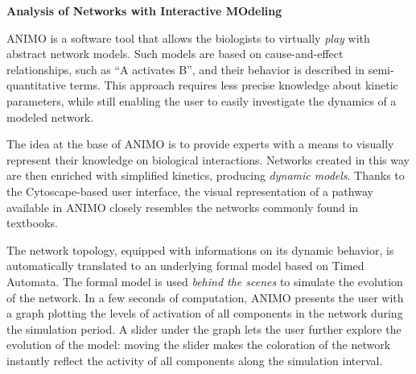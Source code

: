 


\begin{mdframed}[style=ANIMObox]
{\bf Analysis of Networks with Interactive MOdeling}

\small
ANIMO is a software tool that allows the biologists to virtually \emph{play} with abstract network models.
Such models are based on cause-and-effect relationships, such as ``A activates B'', and their
behavior is described in semi-quantitative terms. This approach requires less precise knowledge about
kinetic parameters, while still enabling the user to easily investigate the dynamics of a modeled network.

The idea at the base of ANIMO is to provide experts with a means to visually represent their knowledge on biological interactions.
Networks created in this way are then enriched with simplified kinetics, producing \emph{dynamic models}.
Thanks to the Cytoscape-based user interface, the visual representation of a pathway available in ANIMO
closely resembles the networks commonly found in textbooks.

The network topology, equipped with informations
on its dynamic behavior, is automatically translated to an underlying formal model based on Timed Automata.
The formal model is used \emph{behind the scenes} to simulate the evolution of the network.
In a few seconds of computation, ANIMO presents the user with a graph plotting the levels of activation
of all components in the network during the simulation period.
A slider under the graph lets the user further explore the evolution of the model:
moving the slider makes the coloration of the network instantly reflect the activity of
all components along the simulation interval.
\end{mdframed}
